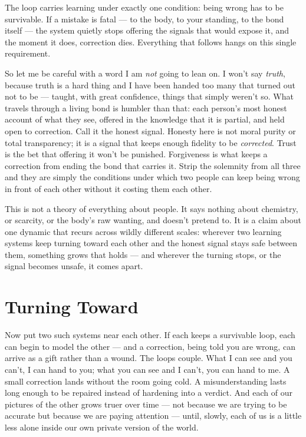 \documentclass[12pt, a4paper]{article}
\begin{document}
The loop carries learning under exactly one condition: being wrong has to be survivable. If a mistake is fatal — to the body, to your standing, to the bond itself — the system quietly stops offering the signals that would expose it, and the moment it does, correction dies. Everything that follows hangs on this single requirement.

So let me be careful with a word I am \textit{not} going to lean on. I won't say \textit{truth}, because truth is a hard thing and I have been handed too many that turned out not to be — taught, with great confidence, things that simply weren't so. What travels through a living bond is humbler than that: each person's most honest account of what they see, offered in the knowledge that it is partial, and held open to correction. Call it the honest signal. Honesty here is not moral purity or total transparency; it is a signal that keeps enough fidelity to be \textit{corrected}. Trust is the bet that offering it won't be punished. Forgiveness is what keeps a correction from ending the bond that carries it. Strip the solemnity from all three and they are simply the conditions under which two people can keep being wrong in front of each other without it costing them each other.

This is not a theory of everything about people. It says nothing about chemistry, or scarcity, or the body's raw wanting, and doesn't pretend to. It is a claim about one dynamic that recurs across wildly different scales: wherever two learning systems keep turning toward each other and the honest signal stays safe between them, something grows that holds — and wherever the turning stops, or the signal becomes unsafe, it comes apart.

\section*{Turning Toward}
Now put two such systems near each other. If each keeps a survivable loop, each can begin to model the other — and a correction, being told you are wrong, can arrive as a gift rather than a wound. The loops couple. What I can see and you can't, I can hand to you; what you can see and I can't, you can hand to me. A small correction lands without the room going cold. A misunderstanding lasts long enough to be repaired instead of hardening into a verdict. And each of our pictures of the other grows truer over time — not because we are trying to be accurate but because we are paying attention — until, slowly, each of us is a little less alone inside our own private version of the world.
\end{document}
